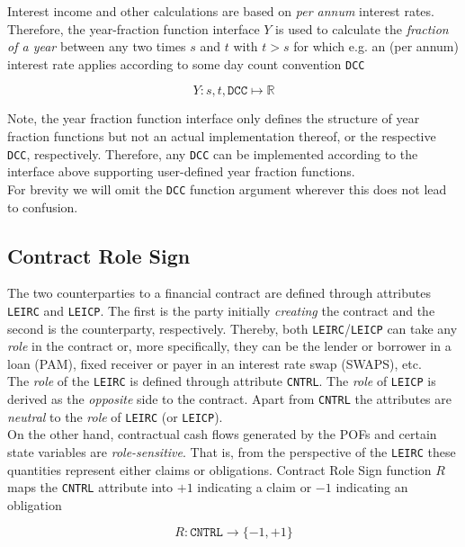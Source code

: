 \documentclass[9pt,oneside]{amsart}
\newcommand{\Real}{\mathbb{R}}
\newcommand{\attr}[1]{\texttt{#1}}
\newcommand{\yfrfunc}{Y}
\begin{document}
\begin{multicols}{2}
Interest income and other calculations are based on \textit{per annum} interest rates. Therefore, the year-fraction function interface $Y$ is used to calculate the \textit{fraction of a year} between any two times $s$ and $t$ with $t>s$ for which e.g. an (per annum) interest rate applies according to some day count convention \attr{DCC}

\[
	\yfrfunc: s,t,\attr{DCC} \mapsto \Real
\]

Note, the year fraction function interface only defines the structure of year fraction functions but not an actual implementation thereof, or the respective \attr{DCC}, respectively. Therefore, any \attr{DCC} can be implemented according to the interface above supporting user-defined year fraction functions.\\

For brevity we will omit the \attr{DCC} function argument wherever this does not lead to confusion.


\subsection{Contract Role Sign}

The two counterparties to a financial contract are defined through attributes \attr{LEIRC} and \attr{LEICP}. The first is the party initially \textit{creating} the contract and the second is the counterparty, respectively. Thereby, both \attr{LEIRC}/\attr{LEICP} can take any \textit{role} in the contract or, more specifically, they can be the lender or borrower in a loan (PAM), fixed receiver or payer in an interest rate swap (SWAPS), etc.\\

The \textit{role} of the \attr{LEIRC} is defined through attribute \attr{CNTRL}. The \textit{role} of \attr{LEICP} is derived as the \textit{opposite} side to the contract. Apart from \attr{CNTRL} the attributes are \textit{neutral} to the \textit{role} of \attr{LEIRC} (or \attr{LEICP}).\\

On the other hand, contractual cash flows generated by the POFs and certain state variables are \textit{role-sensitive}. That is, from the perspective of the \attr{LEIRC} these quantities represent either claims or obligations. Contract Role Sign function $R$ maps the \attr{CNTRL} attribute into $+1$ indicating a claim or $-1$ indicating an obligation

\[
	R : \attr{CNTRL} \rightarrow \{-1, +1 \}
\]


\end{multicols}
\end{document}
